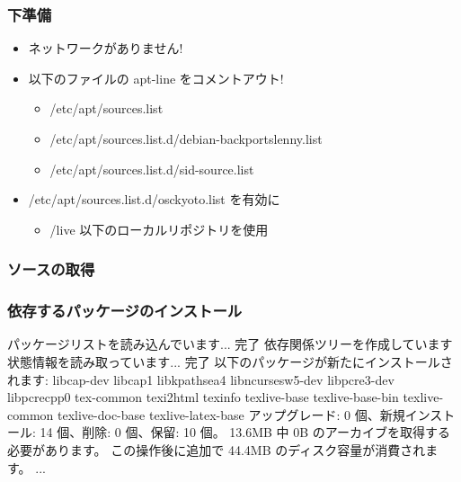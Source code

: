 \documentclass[cjk,dvipdfmx,12pt,%
hyperref={bookmarks=true,bookmarksnumbered=true,bookmarksopen=false,%
colorlinks=false,%
pdftitle={野良ビルドから始めるパッケージ作成},%
pdfauthor={佐々木洋平},%
pdfsubject={第37回関西Debian勉強会 at OSC 2010 Kansai$@$kyoto},%
}]{beamer}
\begin{document}
\begin{frame}[fragile]
\frametitle{下準備}


\begin{itemize}
\item ネットワークがありません!
\item 以下のファイルの apt-line をコメントアウト!

\begin{itemize}
\item /etc/apt/sources.list
\item /etc/apt/sources.list.d/debian-backports\textunderscore{}lenny.list
\item /etc/apt/sources.list.d/sid-source.list
\end{itemize}
\item /etc/apt/sources.list.d/osckyoto.list を有効に

\begin{itemize}
\item /live 以下のローカルリポジトリを使用
\end{itemize}
\end{itemize}

\end{frame}

\begin{frame}[fragile]
\frametitle{ソースの取得}


\begin{commandline}
\end{commandline}


\end{frame}

\begin{frame}[fragile]
\frametitle{依存するパッケージのインストール}


\begin{commandline}
パッケージリストを読み込んでいます... 完了
依存関係ツリーを作成しています
状態情報を読み取っています... 完了
以下のパッケージが新たにインストールされます:
  libcap-dev libcap1 libkpathsea4 libncursesw5-dev libpcre3-dev
  libpcrecpp0 tex-common texi2html texinfo texlive-base texlive-base-bin
  texlive-common texlive-doc-base texlive-latex-base
アップグレード: 0 個、新規インストール: 14 個、削除: 0 個、保留: 10 個。
13.6MB 中 0B のアーカイブを取得する必要があります。
この操作後に追加で 44.4MB のディスク容量が消費されます。
...
\end{commandline}


\end{frame}
\end{document}
